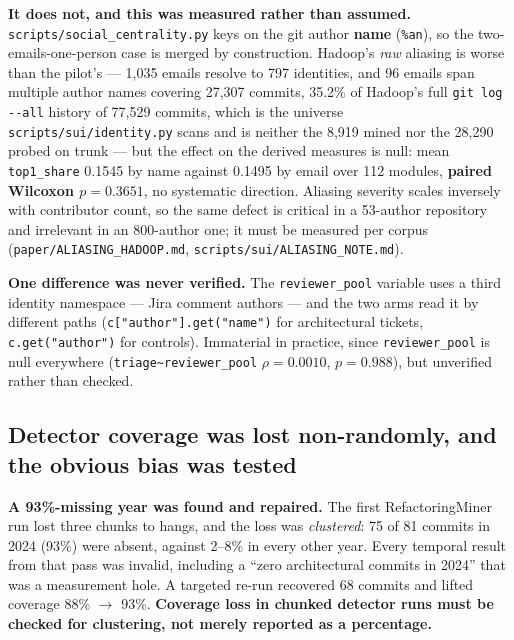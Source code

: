 \documentclass[11pt,a4paper]{article}
\begin{document}
\textbf{It does not, and this was measured rather than assumed.} \texttt{scripts/\allowbreak{}social\_\allowbreak{}centrality.\allowbreak{}py} keys on the git author \textbf{name} (\texttt{\%an}), so the two-emails-one-person case is merged by construction. Hadoop's \emph{raw} aliasing is worse than the pilot's --- 1,035 emails resolve to 797 identities, and 96 emails span multiple author names covering 27,307 commits, 35.2\% of Hadoop's full \texttt{git log -\allowbreak{}-\allowbreak{}all} history of 77,529 commits, which is the universe \texttt{scripts/\allowbreak{}sui/\allowbreak{}identity.\allowbreak{}py} scans and is neither the 8,919 mined nor the 28,290 probed on trunk --- but the effect on the derived measures is null: mean \texttt{top1\_\allowbreak{}share} 0.1545 by name against 0.1495 by email over 112 modules, \textbf{paired Wilcoxon $p=0.3651$}, no systematic direction. Aliasing severity scales inversely with contributor count, so the same defect is critical in a 53-author repository and irrelevant in an 800-author one; it must be measured per corpus (\texttt{paper/\allowbreak{}ALIASING\_\allowbreak{}HADOOP.\allowbreak{}md}, \texttt{scripts/\allowbreak{}sui/\allowbreak{}ALIASING\_\allowbreak{}NOTE.\allowbreak{}md}).

\textbf{One difference was never verified.} The \texttt{reviewer\_\allowbreak{}pool} variable uses a third identity namespace --- Jira comment authors --- and the two arms read it by different paths (\texttt{c["author"].\allowbreak{}get("name")} for architectural tickets, \texttt{c.\allowbreak{}get("author")} for controls). Immaterial in practice, since \texttt{reviewer\_\allowbreak{}pool} is null everywhere (\texttt{triage\textasciitilde{}reviewer\_\allowbreak{}pool} $\rho = 0.0010$, $p = 0.988$), but unverified rather than checked.

\subsection{Detector coverage was lost non-randomly, and the obvious bias was tested}
\label{sec:6.4}

\textbf{A 93\%-missing year was found and repaired.} The first RefactoringMiner run lost three chunks to hangs, and the loss was \emph{clustered}: 75 of 81 commits in 2024 (93\%) were absent, against 2--8\% in every other year. Every temporal result from that pass was invalid, including a ``zero architectural commits in 2024'' that was a measurement hole. A targeted re-run recovered 68 commits and lifted coverage 88\% $\rightarrow$ 93\%. \textbf{Coverage loss in chunked detector runs must be checked for clustering, not merely reported as a percentage.}
\end{document}
